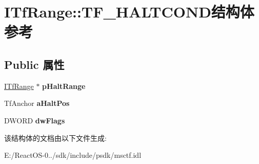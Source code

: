 \hypertarget{struct_i_tf_range_1_1_t_f___h_a_l_t_c_o_n_d}{}\section{I\+Tf\+Range\+:\+:T\+F\+\_\+\+H\+A\+L\+T\+C\+O\+N\+D结构体 参考}
\label{struct_i_tf_range_1_1_t_f___h_a_l_t_c_o_n_d}
\subsection*{Public 属性}
\begin{DoxyCompactItemize}
\item 
\mbox{\label{struct_i_tf_range_1_1_t_f___h_a_l_t_c_o_n_d_a4b555326217734b2f931f68046df0243}} 
\hyperlink{interface_i_tf_range}{I\+Tf\+Range} $\ast$ {\bfseries p\+Halt\+Range}
\item 
\mbox{\label{struct_i_tf_range_1_1_t_f___h_a_l_t_c_o_n_d_aeae38cd889f6e76e7f2a4339d9cbb351}} 
Tf\+Anchor {\bfseries a\+Halt\+Pos}
\item 
\mbox{\label{struct_i_tf_range_1_1_t_f___h_a_l_t_c_o_n_d_abe2005e204aebb1621b1876d0268daa4}} 
D\+W\+O\+RD {\bfseries dw\+Flags}
\end{DoxyCompactItemize}


该结构体的文档由以下文件生成\+:\begin{DoxyCompactItemize}
\item 
E\+:/\+React\+O\+S-\/0../sdk/include/psdk/msctf.\+idl\end{DoxyCompactItemize}
